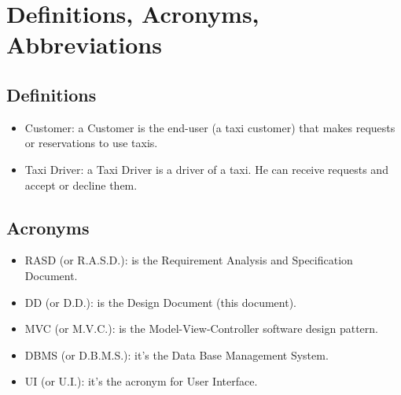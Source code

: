 \documentclass[../../../../dd.tex]{subfiles}
\begin{document}
	\section{Definitions, Acronyms, Abbreviations}

		\subsection{Definitions}
			\begin{itemize}
				\item Customer: a Customer is the end-user (a taxi customer) that makes requests or reservations to use taxis.
				\item Taxi Driver: a Taxi Driver is a driver of a taxi. He can receive requests and accept or decline them.
			\end{itemize}

		\subsection{Acronyms}
			\begin{itemize}
				\item RASD (or R.A.S.D.): is the Requirement Analysis and Specification Document.
				\item DD (or D.D.): is the Design Document (this document).
				\item MVC (or M.V.C.): is the Model-View-Controller software design pattern.
				\item DBMS (or D.B.M.S.): it's the Data Base Management System.
				\item UI (or U.I.): it's the acronym for User Interface.
			\end{itemize}
\end{document}
